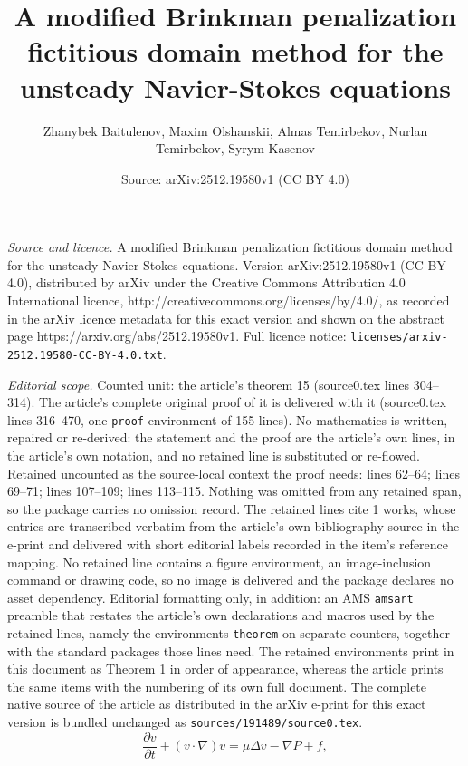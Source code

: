 \documentclass[10pt,a4paper]{amsart}
\title{A modified Brinkman penalization fictitious domain method for the unsteady Navier-Stokes equations}
\author{Zhanybek Baitulenov, Maxim Olshanskii, Almas Temirbekov, Nurlan Temirbekov, Syrym Kasenov}
\date{Source: arXiv:2512.19580v1 (CC BY 4.0)}
\begin{document}
\maketitle

\noindent\emph{Source and licence.} A modified Brinkman penalization fictitious domain method for the unsteady Navier-Stokes equations. Version arXiv:2512.19580v1 (CC BY 4.0), distributed by arXiv under the Creative Commons Attribution 4.0 International licence, http://creativecommons.org/licenses/by/4.0/, as recorded in the arXiv licence metadata for this exact version and shown on the abstract page https://arxiv.org/abs/2512.19580v1. Full licence notice: \texttt{licenses/arxiv-2512.19580-CC-BY-4.0.txt}.\par\smallskip

\noindent\textit{Editorial scope.} Counted unit: the article's theorem 15 (source0.tex lines 304--314). The article's complete original proof of it is delivered with it (source0.tex lines 316--470, one \texttt{proof} environment of 155 lines). No mathematics is written, repaired or re-derived: the statement and the proof are the article's own lines, in the article's own notation, and no retained line is substituted or re-flowed.  Retained uncounted as the source-local context the proof needs: lines 62--64; lines 69--71; lines 107--109; lines 113--115.  Nothing was omitted from any retained span, so the package carries no omission record.  The retained lines cite 1 works, whose entries are transcribed verbatim from the article's own bibliography source in the e-print and delivered with short editorial labels recorded in the item's reference mapping.  No retained line contains a figure environment, an image-inclusion command or drawing code, so no image is delivered and the package declares no asset dependency.  Editorial formatting only, in addition: an AMS \texttt{amsart} preamble that restates the article's own declarations and macros used by the retained lines, namely the environments \texttt{theorem} on separate counters, together with the standard packages those lines need.  The retained environments print in this document as Theorem 1 in order of appearance, whereas the article prints the same items with the numbering of its own full document.  The complete native source of the article as distributed in the arXiv e-print for this exact version is bundled unchanged as \texttt{sources/191489/source0.tex}.
\begin{equation} \label{St 1}
	\frac{\partial v}{\partial t} + (v\cdot\nabla)v = \mu\Delta v - \nabla P + f,
\end{equation}
\end{document}
